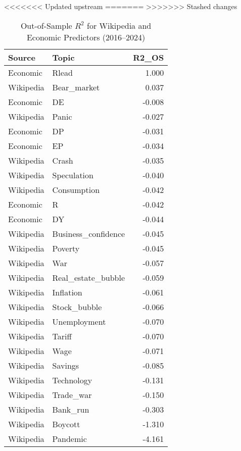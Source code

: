 <<<<<<< Updated upstream
=======
>>>>>>> Stashed changes
\begin{table}[ht]
\centering
\begin{tabular}{llr}
  \hline
Source & Topic & R2\_OS \\ 
  \hline
Economic & Rlead & 1.000 \\ 
  Wikipedia & Bear\_market & 0.037 \\ 
  Economic & DE & -0.008 \\ 
  Wikipedia & Panic & -0.027 \\ 
  Economic & DP & -0.031 \\ 
  Economic & EP & -0.034 \\ 
  Wikipedia & Crash & -0.035 \\ 
  Wikipedia & Speculation & -0.040 \\ 
  Wikipedia & Consumption & -0.042 \\ 
  Economic & R & -0.042 \\ 
  Economic & DY & -0.044 \\ 
  Wikipedia & Business\_confidence & -0.045 \\ 
  Wikipedia & Poverty & -0.045 \\ 
  Wikipedia & War & -0.057 \\ 
  Wikipedia & Real\_estate\_bubble & -0.059 \\ 
  Wikipedia & Inflation & -0.061 \\ 
  Wikipedia & Stock\_bubble & -0.066 \\ 
  Wikipedia & Unemployment & -0.070 \\ 
  Wikipedia & Tariff & -0.070 \\ 
  Wikipedia & Wage & -0.071 \\ 
  Wikipedia & Savings & -0.085 \\ 
  Wikipedia & Technology & -0.131 \\ 
  Wikipedia & Trade\_war & -0.150 \\ 
  Wikipedia & Bank\_run & -0.303 \\ 
  Wikipedia & Boycott & -1.310 \\ 
  Wikipedia & Pandemic & -4.161 \\ 
   \hline
\end{tabular}
\caption{Out-of-Sample $R^2$ for Wikipedia and Economic Predictors (2016–2024)} 
\label{tab:table8_combined}
\end{table}
